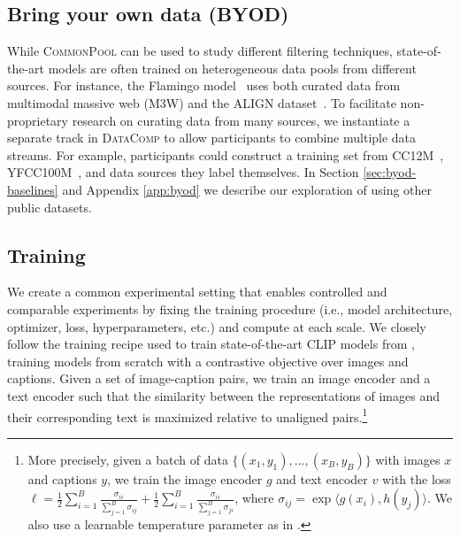 \documentclass[dvipsnames,11pt]{article}
\newcommand{\datanet}{\textsc{DataComp}\xspace}
\newcommand{\users}{participants\xspace}
\newcommand{\byod}{\textsc{BYOD}\xspace}
\newcommand{\pool}{\textsc{CommonPool}\xspace}
\begin{document}
\subsection{Bring your own data (\byod)}
\label{sec:byod}

While \pool can be used to study different filtering techniques, state-of-the-art models are often trained on heterogeneous data pools from different sources.
For instance, the Flamingo model~\cite{alayrac2022flamingo} uses both curated data from multimodal massive web (M3W) and the ALIGN dataset~\cite{jia2021scaling}.
To facilitate non-proprietary research on curating data from many sources, we instantiate a separate track in \datanet to allow \users to combine multiple data streams.
For example, \users could construct a training set from CC12M~\cite{changpinyo2021conceptual}, YFCC100M~\cite{yfcc100m}, and data sources they label themselves. In Section \ref{sec:byod-baselines} and Appendix \ref{app:byod} we describe our exploration of using other public datasets.

\subsection{Training}
\label{sec:training}

We create a common experimental setting that enables controlled and comparable experiments by fixing the training procedure (i.e., model architecture, optimizer, loss, hyperparameters, etc.) and compute at each scale. We closely follow the training recipe used to train state-of-the-art CLIP models from \citet{radford2021learning}, 
training models from scratch with a contrastive objective over images and captions.
Given a set of image-caption pairs, we train an image encoder and a text encoder such that the similarity between the representations of images and their corresponding text is maximized relative to unaligned pairs.\footnote{More precisely, given a batch of data $\{(x_1,y_1),...,(x_B,y_B)\}$ with images $x$ and captions $y$, we train the image encoder $g$ and text encoder $v$ with the loss $\ell=\frac{1}{2}\sum_{i=1}^B \frac{\sigma_{ii}}{\sum_{j=1}^B\sigma_{ij} } + 
\frac{1}{2}\sum_{i=1}^B \frac{\sigma_{ii}}{\sum_{j=1}^B\sigma_{ji}}
$, where $\sigma_{ij} = \exp{\langle g(x_i), h(y_j) \rangle}$. 
We also use a learnable temperature parameter as in \citet{radford2021learning}.}
\end{document}
